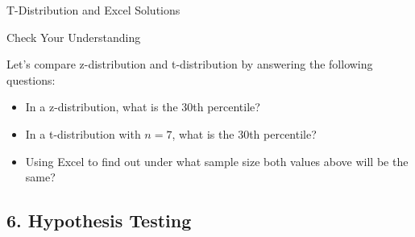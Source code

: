 \documentclass{beamer}
\begin{document}
\begin{frame}{T-Distribution and Excel Solutions}


\begin{table}[]
\end{table}

\end{frame}




\begin{frame}{Check Your Understanding}

Let's compare z-distribution and t-distribution by answering the following questions: 

\begin{itemize}
\item In a z-distribution, what is the 30th percentile?
\item In a t-distribution with $n = 7$, what is the 30th percentile? 
\item Using Excel to find out under what sample size both values above will be the same? 
\end{itemize}




\end{frame}







\subsection{6. Hypothesis Testing}
\end{document}
